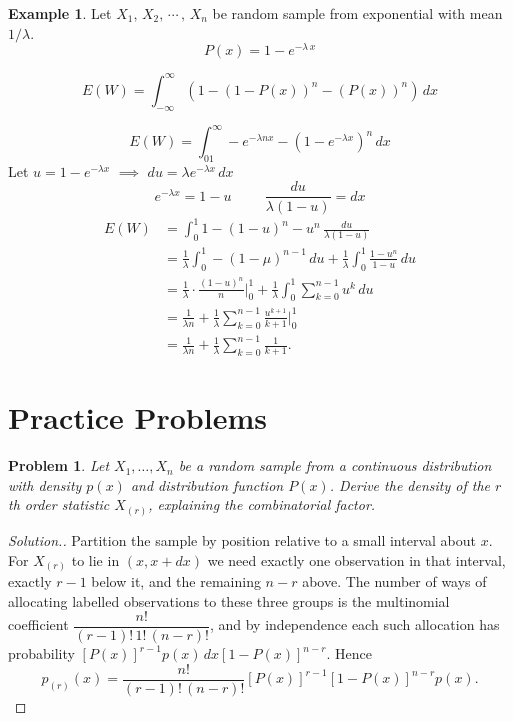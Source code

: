 \documentclass[12pt,a4paper]{report}
\theoremstyle{definition}
\newtheorem{exa}[thm]{Example}
\theoremstyle{plain}
\newtheorem{problemx}{Problem}[section]
\newenvironment{problem}{\begin{problemx}}{\end{problemx}}
\newenvironment{solution}
  {\renewcommand{\qedsymbol}{}\begin{proof}[\textit{Solution}.]}
  {\end{proof}}
\begin{document}
\begin{exa}
Let $X_1, \, X_2, \, \cdots\, , \, X_n$ be random sample from exponential with mean $1/\lambda$.
$$P(x) = 1 - e^{-\lambda\, x}$$

$$E(W)  = \int^{\infty}_{-\infty}\left(1 - \left(1 - P(x)\right)^n - \left(P(x)\right)^n\right)\, dx$$

$$E(W) = \int^{\infty}_01 - e^{-\lambda nx} - \left(1 - e^{-\lambda x}\right)^n\, dx$$
Let $u = 1 - e^{-\lambda x} \,\, \implies\, \, du = \lambda e^{-\lambda x}\, dx$
$$e^{-\lambda x} = 1 - u\hspace{1cm} \frac{du}{\lambda (1 - u)} = dx$$
\begin{align*}
E(W) & = \int^1_0 1 - (1 - u)^n - u^n \, \frac{du}{\lambda (1 - u)}\\
& = \frac{1}{\lambda}\int^1_0-(1 - \mu)^{n - 1}\, du + \frac{1}{\lambda}\int^1_0\frac{1 - u^n}{1 - u}\, du\\
& = \frac{1}{\lambda}\cdot\frac{(1 - u)^n}{n}\Big|^1_0 + \frac{1}{\lambda}\int^1_0\sum_{k = 0}^{n - 1} u^k\, du\\
& = \frac{1}{\lambda n} + \frac{1}{\lambda}\sum^{n - 1}_{k = 0}\frac{u^{k + 1}}{k + 1}\Big|^1_0\\
& = \frac{1}{\lambda n} + \frac{1}{\lambda}\sum^{n - 1}_{k  = 0}\frac{1}{k + 1}.
\end{align*}
\end{exa}


















\section{Practice Problems}

\begin{problem}
Let $X_1,\dots,X_n$ be a random sample from a continuous distribution with
density $p(x)$ and distribution function $P(x)$. Derive the density of the
$r$th order statistic $X_{(r)}$, explaining the combinatorial factor.
\end{problem}

\begin{solution}
Partition the sample by position relative to a small interval about $x$. For
$X_{(r)}$ to lie in $(x, x+dx)$ we need exactly one observation in that
interval, exactly $r-1$ below it, and the remaining $n-r$ above. The number of
ways of allocating labelled observations to these three groups is the
multinomial coefficient $\dfrac{n!}{(r-1)!\,1!\,(n-r)!}$, and by independence
each such allocation has probability
$\left[P(x)\right]^{r-1}p(x)\,dx\left[1-P(x)\right]^{n-r}$. Hence
$$p_{(r)}(x) = \frac{n!}{(r-1)!\,(n-r)!}\left[P(x)\right]^{r-1}
\left[1-P(x)\right]^{n-r}p(x).$$
\end{solution}
\end{document}

